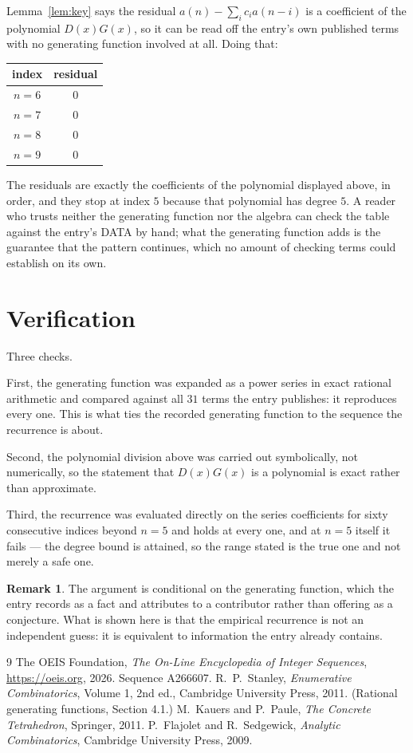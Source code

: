 \documentclass[11pt,a4paper]{article}
\theoremstyle{plain}
\theoremstyle{definition}
\newtheorem{remark}[theorem]{Remark}
\begin{document}
Lemma~\ref{lem:key} says the residual $a(n)-\sum_ic_ia(n-i)$ is a coefficient of the
polynomial $D(x)G(x)$, so it can be read off the entry's own published terms with no
generating function involved at all. Doing that:
\begin{center}
\begin{tabular}{cc}
index & residual \\ \hline
$n=6$ & $0$ \\
$n=7$ & $0$ \\
$n=8$ & $0$ \\
$n=9$ & $0$
\end{tabular}
\end{center}
The residuals are exactly the coefficients of the polynomial displayed above, in order, and
they stop at index $5$ because that polynomial has degree $5$. A reader who trusts
neither the generating function nor the algebra can check the table against the entry's DATA
by hand; what the generating function adds is the guarantee that the pattern continues, which
no amount of checking terms could establish on its own.

\section{Verification}

Three checks.

First, the generating function was expanded as a power series in exact rational arithmetic and
compared against all $31$ terms the entry publishes: it reproduces every one. This is
what ties the recorded generating function to the sequence the recurrence is about.

Second, the polynomial division above was carried out symbolically, not numerically, so the
statement that $D(x)G(x)$ is a polynomial is exact rather than approximate.

Third, the recurrence was evaluated directly on the series coefficients for sixty consecutive
indices beyond $n=5$ and holds at every one, and at $n=5$ itself it fails --- the
degree bound is attained, so the range stated is the true one and not merely a safe one.

\begin{remark}
The argument is conditional on the generating function, which the entry records as a fact and
attributes to a contributor rather than offering as a conjecture. What is shown here is that
the empirical recurrence is not an independent guess: it is equivalent to information the
entry already contains.
\end{remark}

\begin{thebibliography}{9}
 The OEIS Foundation, \emph{The On-Line Encyclopedia of Integer
Sequences}, \url{https://oeis.org}, 2026. Sequence A266607.
 R.~P.~Stanley, \emph{Enumerative Combinatorics}, Volume 1, 2nd ed.,
Cambridge University Press, 2011. (Rational generating functions, Section 4.1.)
 M.~Kauers and P.~Paule, \emph{The Concrete Tetrahedron}, Springer, 2011.
 P.~Flajolet and R.~Sedgewick, \emph{Analytic Combinatorics}, Cambridge
University Press, 2009.
\end{thebibliography}
\end{document}
